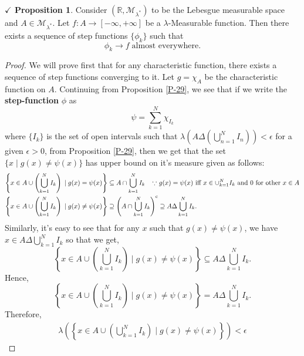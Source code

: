 \documentclass{article}
\theoremstyle{definition}
\theoremstyle{remark}
\theoremstyle{definition}
\theoremstyle{definition}
\newtheorem{proposition}{$\checkmark$ Proposition}
\theoremstyle{definition}
\newcommand{\union}{\cup}
\newcommand{\intrs}{\cap}
\newcommand{\bunion}{\bigcup}
\newcommand{\where}{\;\vert\;}
\newcommand{\R}{\mathbb{R}}
\newcommand{\set}[1]{\mathscr{#1}}
\newcommand{\msigm}[1]{\set{M}_{#1}}
\newcommand{\lm}[1]{\lambda\left (#1\right )}
\begin{document}
\hrulefill
\begin{proposition}\label{P-30}
		Consider $ (\R,\msigm{\lambda^*}) $ to be the Lebesgue measurable space and $ A\in \msigm{\lambda^*} $. Let $ f : A\to [-\infty,+\infty] $ be a $ \lambda $-Measurable function. Then there exists a sequence of step functions $ \{\phi_k\} $ such that
		\[\phi_k \longrightarrow f\;\text{almost everywhere.}\]
\end{proposition}
\begin{proof}
		We will prove first that for any characteristic function, there exists a sequence of step functions converging to it. Let $ g = \chi_A $ be the characteristic function on $ A $. Continuing from Proposition \ref{P-29}, we see that if we write the \textbf{step-function }$ \phi $ as
		\[\psi = \sum_{k=1}^{N} \chi_{I_k}\]
		where $ \{I_k\} $ is the set of open intervals such that $ \lm{A \Delta \left (\bunion_{n=1}^{N} I_n\right )} < \epsilon$ for a given $ \epsilon > 0 $, from Proposition \ref{P-29}, then we get that the set $ \{x\where g(x) \neq \psi(x)\} $ has upper bound on it's measure given as follows:
		\begin{equation*}
			\begin{split}
				\left \{x\in A \union \left (\bunion_{k=1}^{N} I_k\right )\where g(x) = \psi(x)\right \} &\subseteq A \intrs \bunion_{k=1}^{N} I_k \;\;\;\;\text{$ \because $ $ g(x) = \psi(x) $ iff $ x\in \union_{k=1}^{N} I_k$ and $ 0 $ for other $ x \in A $}\\
				\left \{x\in A \union \left (\bunion_{k=1}^{N} I_k\right )\where g(x)\neq \psi(x)\right \}&\supseteq \left (A \intrs \bunion_{k=1}^{N} I_k\right )^{\text{c}}\supseteq A \Delta \bunion_{k=1}^{N} I_k.
			\end{split}
		\end{equation*}
	Similarly, it's easy to see that for any $ x $ such that $ g(x) \neq \psi(x) $, we have $ x \in A\Delta \bunion_{k=1}^{N} I_k $ so that we get,
	\[	\left \{x\in A \union \left (\bunion_{k=1}^{N} I_k\right )\where g(x) \neq \psi(x)\right \}\subseteq A \Delta \bunion_{k=1}^{N} I_k.\]
	Hence, 
	\[	\left \{x\in A \union \left (\bunion_{k=1}^{N} I_k\right )\where g(x) \neq \psi(x)\right \} = A\Delta \bunion_{k=1}^{N} I_k .\]
	Therefore, 
	\begin{equation*}
		\begin{split}
			\lm{	\left \{x\in A \union \left (\bunion_{k=1}^{N} I_k\right )\where g(x) \neq \psi(x)\right \}} < \epsilon
		\end{split}
	\end{equation*}

\end{proof}
\end{document}
